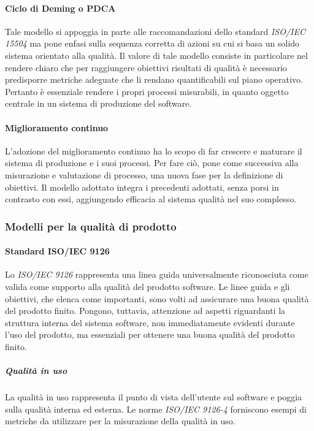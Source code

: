 \documentclass[12pt,a4paper]{article}
\begin{document}
\paragraph{Ciclo di Deming o PDCA}
Tale modello si appoggia in parte alle raccomandazioni dello standard \textit{ISO/IEC 15504} ma pone enfasi sulla sequenza corretta di azioni su cui si basa un solido sistema orientato alla qualità. Il valore di tale modello consiste in particolare nel rendere chiaro che per raggiungere obiettivi risultati di qualità è necessario predisporre metriche adeguate che li rendano quantificabili sul piano operativo. Pertanto è essenziale rendere i propri processi misurabili, in quanto oggetto centrale in un sistema di produzione del software.

\paragraph{Miglioramento continuo}
L'adozione del miglioramento continuo ha lo scopo di far crescere e maturare il sistema di produzione e i suoi processi. Per fare ciò, pone come successiva alla misurazione e valutazione di processo, una nuova fase per la definizione di obiettivi. Il modello adottato integra i precedenti adottati, senza porsi in contrasto con essi, aggiungendo efficacia al sistema qualità nel suo complesso.

\subsubsection{Modelli per la qualità di prodotto}

\paragraph{Standard ISO/IEC 9126}
Lo \textit{ISO/IEC 9126} rappresenta una linea guida universalmente riconosciuta come valida come supporto alla qualità del prodotto software. Le linee guida e gli obiettivi, che elenca come importanti, sono volti ad assicurare una buona qualità del prodotto finito. Pongono, tuttavia, attenzione ad aspetti riguardanti la struttura interna del sistema software, non immediatamente evidenti durante l'uso del prodotto, ma essenziali per ottenere una buona qualità del prodotto finito.

\subparagraph{Qualità in uso}
La qualità in uso rappresenta il punto di vista dell'utente sul software e poggia sulla qualità interna ed esterna. Le norme \textit{ISO/IEC 9126-4} forniscono esempi di metriche da utilizzare per la misurazione della qualità in uso.
\end{document}
